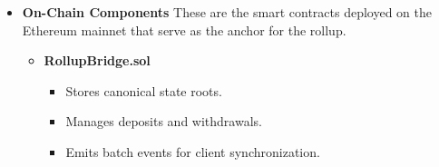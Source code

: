 \begin{itemize}
\begin{itemize}
        \item \textbf{Prover:}
        The prover generates cryptographic proofs to ensure the correctness of state transitions.
        \begin{itemize}
            \item {Circuit Backend:} zkSNARK/STARK circuits verify state transitions ($\text{OldRoot} \rightarrow \text{NewRoot}$) \cite{sheybani2025zero}.
            \item {Default Backend:} Circom + Groth16/Plonk for rapid prototyping \cite{iden3_circom, sui_groth16, polygon_plonky2}.
            \item {Optional Backends:} Plonky2 or Halo2 for performance comparisons \cite{polygon_plonky2, zcash_halo2}.
            \item {Proof Generator:} Produces validity proofs ensuring correctness of state transitions.
        \end{itemize}
        
        \item \textbf{Submitter:}
        The submitter packages and sends the rollup data to the Ethereum mainnet.
        \begin{itemize}
            \item {Batch Packager:} Packages transactions, state roots, and validity proofs.
            \item {On-chain Broadcaster:} Submits canonical state roots, ZK proofs, and DA commitments to Ethereum.
            \item {Data Availability Connector:} Chooses DA mode (calldata, compression, or external DA).
        \end{itemize}
    \end{itemize}
    
    \item \textbf{On-Chain Components}
    These are the smart contracts deployed on the Ethereum mainnet that serve as the anchor for the rollup.
    \begin{itemize}
        \item \textbf{RollupBridge.sol}
            \begin{itemize}
                \item Stores canonical state roots.
                \item Manages deposits and withdrawals.
                \item Emits batch events for client synchronization.
            \end{itemize}
        

\end{itemize}
\end{itemize}
